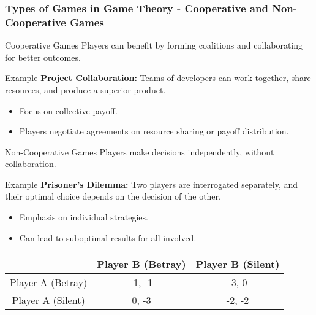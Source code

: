 \documentclass[aspectratio=169]{beamer}
\begin{document}
\begin{frame}[fragile]
    \frametitle{Types of Games in Game Theory - Cooperative and Non-Cooperative Games}
    \begin{block}{Cooperative Games}
        Players can benefit by forming coalitions and collaborating for better outcomes.
    \end{block}
    
    \begin{exampleblock}{Example}
        \textbf{Project Collaboration:} Teams of developers can work together, share resources, and produce a superior product.
    \end{exampleblock}
    
    \begin{itemize}
        \item Focus on collective payoff.
        \item Players negotiate agreements on resource sharing or payoff distribution.
    \end{itemize}

    \begin{block}{Non-Cooperative Games}
        Players make decisions independently, without collaboration.
    \end{block}
    
    \begin{exampleblock}{Example}
        \textbf{Prisoner's Dilemma:} Two players are interrogated separately, and their optimal choice depends on the decision of the other.
    \end{exampleblock}
    
    \begin{itemize}
        \item Emphasis on individual strategies.
        \item Can lead to suboptimal results for all involved.
    \end{itemize}

    \begin{table}[H]
        \centering
        \begin{tabular}{|c|c|c|}
            \hline
            & Player B (Betray) & Player B (Silent) \\
            \hline
            Player A (Betray) & -1, -1 & -3, 0 \\
            \hline
            Player A (Silent) & 0, -3 & -2, -2 \\
            \hline
        \end{tabular}
    \end{table}   
\end{frame}
\end{document}
